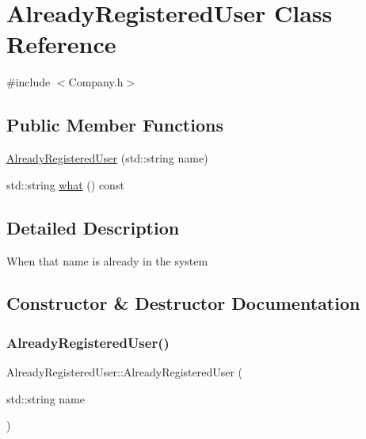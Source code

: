 \hypertarget{class_already_registered_user}{}\section{Already\+Registered\+User Class Reference}
\label{class_already_registered_user}


{\ttfamily \#include $<$Company.\+h$>$}

\subsection*{Public Member Functions}
\begin{DoxyCompactItemize}
\item 
\mbox{\hyperlink{class_already_registered_user_a8daf190044233235e28f8c53e922fabd}{Already\+Registered\+User}} (std\+::string name)
\item 
std\+::string \mbox{\hyperlink{class_already_registered_user_ae9f46091d164347cc12e45591d86d5a5}{what}} () const
\end{DoxyCompactItemize}


\subsection{Detailed Description}
When that name is already in the system 

\subsection{Constructor \& Destructor Documentation}
\mbox{\label{class_already_registered_user_a8daf190044233235e28f8c53e922fabd}} 
\subsubsection{\texorpdfstring{Already\+Registered\+User()}{AlreadyRegisteredUser()}}
{\footnotesize\ttfamily Already\+Registered\+User\+::\+Already\+Registered\+User (\begin{DoxyParamCaption}\item[{std\+::string}]{name }\end{DoxyParamCaption})\hspace{0.3cm}{\ttfamily [inline]}}



